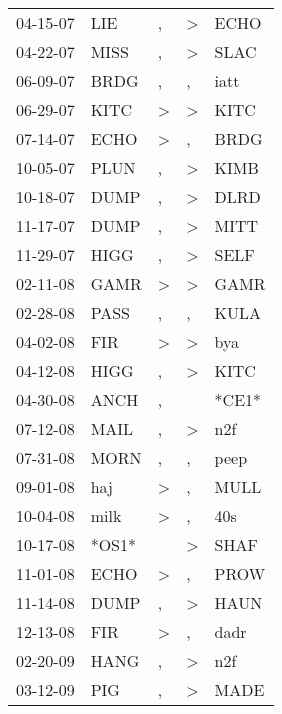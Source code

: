 \begin{supertabular}{lllll}
 04-15-07 &    LIE &                , &     \textgreater &   ECHO \\
 04-22-07 &   MISS &                , &     \textgreater &   SLAC \\
 06-09-07 &   BRDG &                , &                , &   iatt \\
 06-29-07 &   KITC &     \textgreater &     \textgreater &   KITC \\
 07-14-07 &   ECHO &     \textgreater &                , &   BRDG \\
 10-05-07 &   PLUN &                , &     \textgreater &   KIMB \\
 10-18-07 &   DUMP &                , &     \textgreater &   DLRD \\
 11-17-07 &   DUMP &                , &     \textgreater &   MITT \\
 11-29-07 &   HIGG &                , &     \textgreater &   SELF \\
 02-11-08 &   GAMR &     \textgreater &     \textgreater &   GAMR \\
 02-28-08 &   PASS &                , &                , &   KULA \\
 04-02-08 &    FIR &     \textgreater &     \textgreater &    bya \\
 04-12-08 &   HIGG &                , &     \textgreater &   KITC \\
 04-30-08 &   ANCH &                , &                  &  *CE1* \\
 07-12-08 &   MAIL &                , &     \textgreater &    n2f \\
 07-31-08 &   MORN &                , &                , &   peep \\
 09-01-08 &    haj &     \textgreater &                , &   MULL \\
 10-04-08 &   milk &     \textgreater &                , &    40s \\
 10-17-08 &  *OS1* &                  &     \textgreater &   SHAF \\
 11-01-08 &   ECHO &     \textgreater &                , &   PROW \\
 11-14-08 &   DUMP &                , &     \textgreater &   HAUN \\
 12-13-08 &    FIR &     \textgreater &                , &   dadr \\
 02-20-09 &   HANG &                , &     \textgreater &    n2f \\
 03-12-09 &    PIG &                , &     \textgreater &   MADE \\

\end{supertabular}
